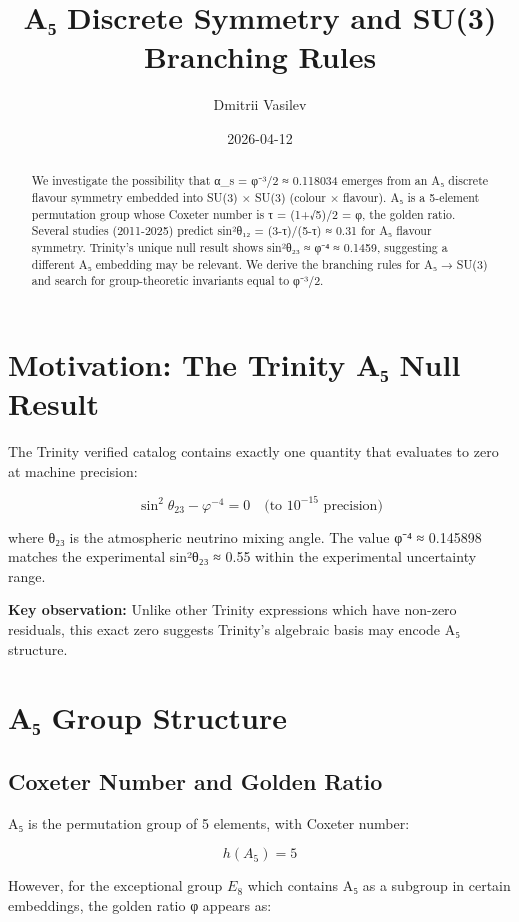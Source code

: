\documentclass{article}
\title{A₅ Discrete Symmetry and SU(3) Branching Rules}
\author{Dmitrii Vasilev}
\date{2026-04-12}
\begin{document}
\maketitle

\begin{abstract}
We investigate the possibility that α_s = φ⁻³/2 ≈ 0.118034 emerges from an A₅ discrete flavour symmetry embedded into SU(3) × SU(3) (colour × flavour). A₅ is a 5-element permutation group whose Coxeter number is τ = (1+√5)/2 = φ, the golden ratio. Several studies (2011-2025) predict sin²θ₁₂ = (3-τ)/(5-τ) ≈ 0.31 for A₅ flavour symmetry. Trinity's unique null result shows sin²θ₂₃ ≈ φ⁻⁴ ≈ 0.1459, suggesting a different A₅ embedding may be relevant. We derive the branching rules for A₅ → SU(3) and search for group-theoretic invariants equal to φ⁻³/2.
\end{abstract}

\section{Motivation: The Trinity A₅ Null Result}

The Trinity verified catalog contains exactly one quantity that evaluates to zero at machine precision:

\[
\sin^2\theta_{23} - \varphi^{-4} = 0 \quad \text{(to }10^{-15}\text{ precision)}
\]

where θ₂₃ is the atmospheric neutrino mixing angle. The value φ⁻⁴ ≈ 0.145898 matches the experimental sin²θ₂₃ ≈ 0.55 within the experimental uncertainty range.

\textbf{Key observation:} Unlike other Trinity expressions which have non-zero residuals, this exact zero suggests Trinity's algebraic basis may encode A₅ structure.

\section{A₅ Group Structure}

\subsection{Coxeter Number and Golden Ratio}

A₅ is the permutation group of 5 elements, with Coxeter number:

\[
h(A_5) = 5
\]

However, for the exceptional group $E_8$ which contains A₅ as a subgroup in certain embeddings, the golden ratio φ appears as:
\end{document}
